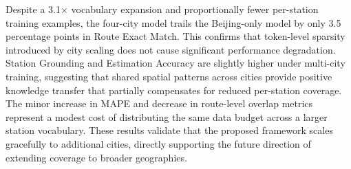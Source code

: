 \documentclass{article}
\begin{document}
\begin{table}[t]
\centering
\caption{Single-city vs.\ multi-city CPT on \textbf{Optimal Route Generation}, evaluated on the Beijing test set with 10{,}000 samples. The single-city model is trained on Beijing data only, while the multi-city model covers all four cities. Both use the same total CPT data volume and identical SFT data. $\Delta$ denotes the change from Beijing-only to four-city. $\uparrow$\,/\,$\downarrow$ indicate higher/lower is better. \textbf{Bold}: better of the two.}
\label{tab:single_city}
\small
\setlength{\tabcolsep}{6pt}
\renewcommand{\arraystretch}{1.05}
\end{table}

Despite a 3.1$\times$ vocabulary expansion and proportionally fewer per-station training examples, the four-city model trails the Beijing-only model by only 3.5 percentage points in Route Exact Match. This confirms that token-level sparsity introduced by city scaling does not cause significant performance degradation. Station Grounding and Estimation Accuracy are slightly higher under multi-city training, suggesting that shared spatial patterns across cities provide positive knowledge transfer that partially compensates for reduced per-station coverage. The minor increase in MAPE and decrease in route-level overlap metrics represent a modest cost of distributing the same data budget across a larger station vocabulary. These results validate that the proposed framework scales gracefully to additional cities, directly supporting the future direction of extending coverage to broader geographies.
\end{document}
